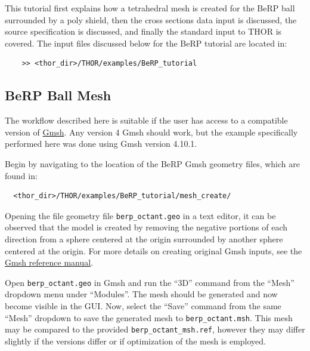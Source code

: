 This tutorial first explains how a tetrahedral mesh is created for the BeRP ball surrounded by a poly shield, then the cross sections data input is discussed, the source specification is discussed, and finally the standard input to THOR is covered.
The input files discussed below for the BeRP tutorial are located in:
\begin{verbatim}
    >> <thor_dir>/THOR/examples/BeRP_tutorial
\end{verbatim}

\subsection{BeRP Ball Mesh}\label{ch:tuts:sec:berp:ssec:mesh}

The workflow described here is suitable if the user has access to a compatible version of \href{https://gmsh.info/}{Gmsh}.
Any version 4 Gmsh should work, but the example specifically performed here was done using Gmsh version 4.10.1.

Begin by navigating to the location of the BeRP Gmsh geometry files, which are found in:
\begin{verbatim}
  <thor_dir>/THOR/examples/BeRP_tutorial/mesh_create/
\end{verbatim}
Opening the file geometry file \verb"berp_octant.geo" in a text editor, it can be observed that the model is created by removing the negative portions of each direction from a sphere centered at the origin surrounded by another sphere centered at the origin.
For more details on creating original Gmsh inputs, see the \href{https://gmsh.info/doc/texinfo/gmsh.html}{Gmsh reference manual}.

Open \verb"berp_octant.geo" in Gmsh and run the ``3D'' command from the ``Mesh'' dropdown menu under ``Modules''.
The mesh should be generated and now become visible in the \ac{GUI}.
Now, select the ``Save'' command from the same ``Mesh'' dropdown to save the generated mesh to \verb"berp_octant.msh".
This mesh may be compared to the provided \verb"berp_octant_msh.ref", however they may differ slightly if the versions differ or if optimization of the mesh is employed.

